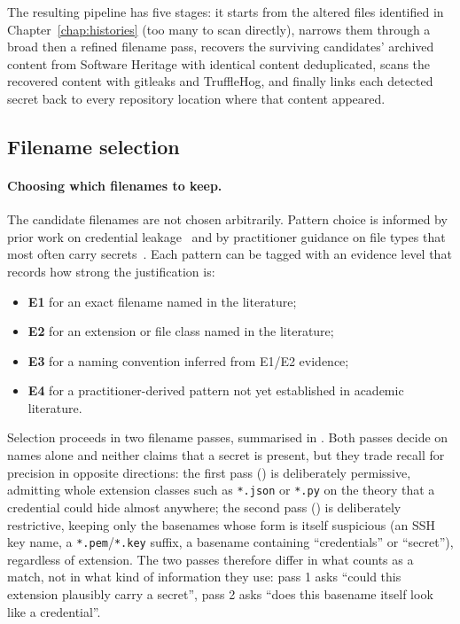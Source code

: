 The resulting pipeline has five stages: it starts from the altered files identified in Chapter~\ref{chap:histories} (too many to scan directly), narrows them through a broad then a refined filename pass, recovers the surviving candidates' archived content from Software Heritage with identical content deduplicated, scans the recovered content with gitleaks and TruffleHog, and finally links each detected secret back to every repository location where that content appeared.

\subsection{Filename selection}

\paragraph{Choosing which filenames to keep.}
The candidate filenames are not chosen arbitrarily.
Pattern choice is informed by prior work on credential leakage~\cite{DBLP:conf/msr/SinhaSDPM15,DBLP:conf/ndss/MeliMR19} and by practitioner guidance on file types that most often carry secrets~\cite{segura2022secrets}.
Each pattern can be tagged with an evidence level that records how strong the justification is:
\begin{itemize}
    \item \textbf{E1} for an exact filename named in the literature;
    \item \textbf{E2} for an extension or file class named in the literature;
    \item \textbf{E3} for a naming convention inferred from E1/E2 evidence;
    \item \textbf{E4} for a practitioner-derived pattern not yet established in academic literature.
\end{itemize}

Selection proceeds in two filename passes, summarised in .
Both passes decide on names alone and neither claims that a secret is present, but they trade recall for precision in opposite directions: the first pass () is deliberately permissive, admitting whole extension classes such as \texttt{*.json} or \texttt{*.py} on the theory that a credential could hide almost anywhere; the second pass () is deliberately restrictive, keeping only the basenames whose form is itself suspicious (an SSH key name, a \texttt{*.pem}/\texttt{*.key} suffix, a basename containing ``credentials'' or ``secret''), regardless of extension.
The two passes therefore differ in what counts as a match, not in what kind of information they use: pass 1 asks ``could this extension plausibly carry a secret'', pass 2 asks ``does this basename itself look like a credential''.

